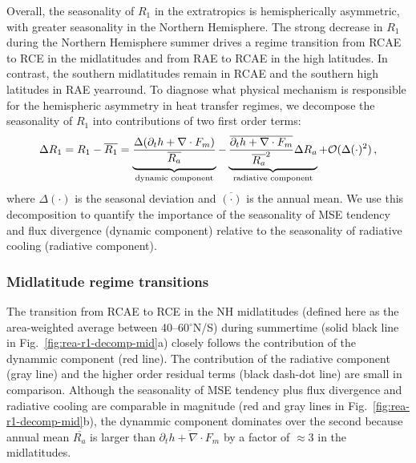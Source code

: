 \documentclass{ametsocV5}
\begin{document}
    Overall, the seasonality of \(R_{1}\) in the extratropics is hemispherically asymmetric, with greater seasonality in the Northern Hemisphere. The strong decrease in \(R_{1}\) during the Northern Hemisphere summer drives a regime transition from RCAE to RCE in the midlatitudes and from RAE to RCAE in the high latitudes. In contrast, the southern midlatitudes remain in RCAE and the southern high latitudes in RAE yearround. To diagnose what physical mechanism is responsible for the hemispheric asymmetry in heat transfer regimes, we decompose the seasonality of $R_1$ into contributions of two first order terms:
    \begin{equation}\label{eq:r1-dev}
      \Delta R_1 = R_1 - \overline{R_1} = \underbrace{\frac{\Delta(\partial_t h + \nabla\cdot F_m)}{\overline{R_a}} \vphantom{\frac{\overline{\partial_t h + \nabla\cdot F_m}}{\overline{R_a}^2}} }_{\text{dynamic component}} - \underbrace{\frac{\overline{\partial_t h + \nabla\cdot F_m}}{\overline{R_a}^2}\Delta R_a}_{\text{radiative component}} + \mathcal{O}(\Delta(\cdot)^2) \, ,
    \end{equation}
    where $\Delta(\cdot)$ is the seasonal deviation and $\overline{(\cdot)}$ is the annual mean. We use this decomposition to quantify the importance of the seasonality of MSE tendency and flux divergence (dynamic component) relative to the seasonality of radiative cooling (radiative component).

    \subsubsection{Midlatitude regime transitions} \label{subsubsec:ml}
      The transition from RCAE to RCE in the NH midlatitudes (defined here as the area-weighted average between 40--60$^{\circ}$N/S) during summertime (solid black line in Fig.~\ref{fig:rea-r1-decomp-mid}a) closely follows the contribution of the dynammic component (red line). The contribution of the radiative component (gray line) and the higher order residual terms (black dash-dot line) are small in comparison. Although the seasonality of MSE tendency plus flux divergence and radiative cooling are comparable in magnitude (red and gray lines in Fig.~\ref{fig:rea-r1-decomp-mid}b), the dynammic component dominates over the second because annual mean $\overline{R_a}$ is larger than $\overline{\partial_t h + \nabla\cdot F_m}$ by a factor of $\approx 3$ in the midlatitudes.
      
\end{document}
